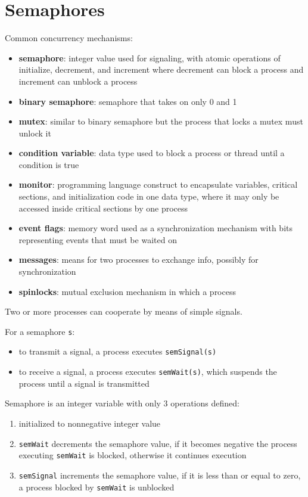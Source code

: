 \documentclass[11pt]{article}
\begin{document}
\section{Semaphores}
\label{sec:org2d17d57}
Common concurrency mechanisms:
\begin{itemize}
\item \textbf{semaphore}: integer value used for signaling, with atomic
operations of initialize, decrement, and increment where
decrement can block a process and increment can unblock a
process
\item \textbf{binary semaphore}: semaphore that takes on only 0 and 1
\item \textbf{mutex}: similar to binary semaphore but the process that
locks a mutex must unlock it
\item \textbf{condition variable}: data type used to block a process
or thread until a condition is true
\item \textbf{monitor}: programming language construct to encapsulate
variables, critical sections, and initialization code
in one data type, where it may only be accessed inside
critical sections by one process
\item \textbf{event flags}: memory word used as a synchronization
mechanism with bits representing events that must be
waited on
\item \textbf{messages}: means for two processes to exchange info,
possibly for synchronization
\item \textbf{spinlocks}: mutual exclusion mechanism in which a
process
\end{itemize}

Two or more processes can cooperate by means of simple signals.

For a semaphore \texttt{s}:
\begin{itemize}
\item to transmit a signal, a process executes \texttt{semSignal(s)}
\item to receive a signal, a process executes \texttt{semWait(s)},
which suspends the process until a signal is transmitted
\end{itemize}

Semaphore is an integer variable with only 3 operations defined:
\begin{enumerate}
\item initialized to nonnegative integer value
\item \texttt{semWait} decrements the semaphore value, if it becomes negative
the process executing \texttt{semWait} is blocked, otherwise it
continues execution
\item \texttt{semSignal} increments the semaphore value, if it is less than
or equal to zero, a process blocked by \texttt{semWait} is
unblocked
\end{enumerate}
\end{document}
